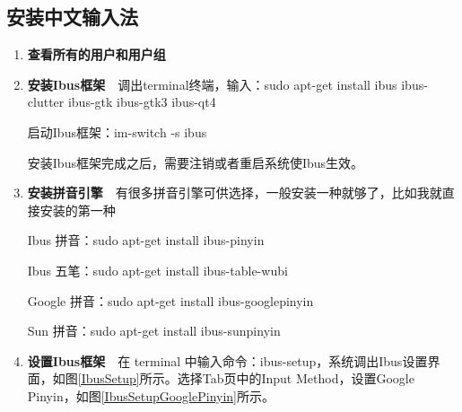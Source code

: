 \documentclass{book}
\begin{document}
\subsection{安装中文输入法}

\begin{enumerate}
	\setcounter{enumi}{0}
	\item{\textbf{查看所有的用户和用户组}}
	\item{\textbf{安装Ibus框架}}~~调出terminal终端，输入：sudo apt-get install ibus ibus-clutter ibus-gtk ibus-gtk3 ibus-qt4
	
启动Ibus框架：im-switch -s ibus
	
	安装Ibus框架完成之后，需要注销或者重启系统使Ibus生效。
	
		
	\item{\textbf{安装拼音引擎}}~~有很多拼音引擎可供选择，一般安装一种就够了，比如我就直接安装的第一种\newline
	
	Ibus 拼音：sudo apt-get install ibus-pinyin\newline
	
	Ibus 五笔：sudo apt-get install ibus-table-wubi\newline
	
	Google 拼音：sudo apt-get install ibus-googlepinyin\newline
			
	Sun 拼音：sudo apt-get install ibus-sunpinyin
			
	\item{\textbf{设置Ibus框架}}~~在 terminal 中输入命令：ibus-setup，系统调出Ibus设置界面，如图\ref{IbusSetup}所示。选择Tab页中的Input Method，设置Google Pinyin，如图\ref{IbusSetupGooglePinyin}所示。

	
\end{enumerate}

	
\end{document}
